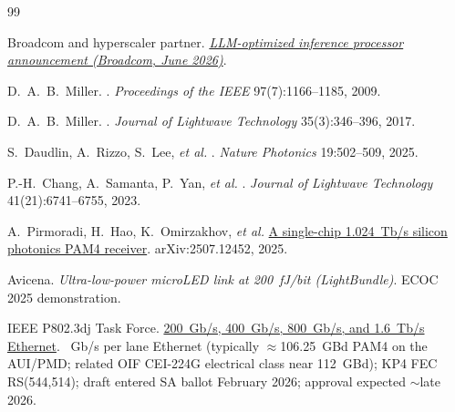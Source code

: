 \begin{thebibliography}{99}

Broadcom and hyperscaler partner.
\newblock \emph{\href{https://investors.broadcom.com/news-releases/news-release-details/openai-and-broadcom-unveil-llm-optimized-intelligence-processor}{LLM-optimized inference processor announcement (Broadcom, June 2026)}}.

D.~A.~B.~Miller.
\newblock {}.
\newblock \emph{Proceedings of the IEEE} 97(7):1166--1185, 2009.

D.~A.~B.~Miller.
\newblock {}.
\newblock \emph{Journal of Lightwave Technology} 35(3):346--396, 2017.

S.~Daudlin, A.~Rizzo, S.~Lee, \emph{et al.}
\newblock {}.
\newblock \emph{Nature Photonics} 19:502--509, 2025.

P.-H.~Chang, A.~Samanta, P.~Yan, \emph{et al.}
\newblock {}.
\newblock \emph{Journal of Lightwave Technology} 41(21):6741--6755, 2023.

A.~Pirmoradi, H.~Hao, K.~Omirzakhov, \emph{et al.}
\newblock \href{https://arxiv.org/abs/2507.12452}{A single-chip 1.024~Tb/s silicon photonics PAM4 receiver}.
\newblock arXiv:2507.12452, 2025.

Avicena.
\newblock \emph{Ultra-low-power microLED link at 200~fJ/bit (LightBundle)}.
\newblock ECOC 2025 demonstration.

IEEE P802.3dj Task Force.
\newblock \href{https://www.ieee802.org/3/dj/}{200~Gb/s, 400~Gb/s, 800~Gb/s, and 1.6~Tb/s Ethernet}.
~Gb/s per lane Ethernet (typically $\approx$106.25~GBd PAM4 on the
AUI/PMD; related OIF CEI-224G electrical class near 112~GBd); KP4 FEC RS(544,514);
draft entered SA ballot February 2026; approval expected $\sim$late 2026.


\end{thebibliography}
